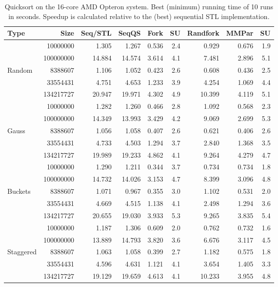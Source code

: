 \documentclass[preprint]{sigplanconf}
\begin{document}
\begin{table*}[t!]
\begin{center}
\begin{tabular}{|lr|rr|rrr||rr|}
\hline
Type & Size & Seq/STL & SeqQS & Fork & SU & Randfork & MMPar & SU \\
\hline
 & 10000000 & 1.305 & 1.267 & 0.536 & 2.4 & 0.929 & 0.676 & 1.9 \\
 & 100000000 & 14.884 & 14.574 & 3.614 & 4.1 & 7.481 & 2.896 & 5.1 \\
Random & 8388607 & 1.106 & 1.052 & 0.423 & 2.6 & 0.608 & 0.436 & 2.5 \\
 & 33554431 & 4.751 & 4.653 & 1.233 & 3.9 & 4.254 & 1.069 & 4.4 \\
 & 134217727 & 20.947 & 19.971 & 4.302 & 4.9 & 10.399 & 4.119 & 5.1 \\
\hline
 & 10000000 & 1.282 & 1.260 & 0.466 & 2.8 & 1.092 & 0.568 & 2.3 \\
 & 100000000 & 14.349 & 13.993 & 3.429 & 4.2 & 9.069 & 2.699 & 5.3 \\
Gauss & 8388607 & 1.056 & 1.058 & 0.407 & 2.6 & 0.621 & 0.406 & 2.6 \\
 & 33554431 & 4.733 & 4.503 & 1.294 & 3.7 & 2.840 & 1.368 & 3.5 \\
 & 134217727 & 19.989 & 19.233 & 4.862 & 4.1 & 9.264 & 4.279 & 4.7 \\
\hline
 & 10000000 & 1.290 & 1.211 & 0.344 & 3.7 & 0.734 & 0.734 & 1.8 \\
 & 100000000 & 14.732 & 14.026 & 3.153 & 4.7 & 8.399 & 3.096 & 4.8 \\
Buckets & 8388607 & 1.071 & 0.967 & 0.355 & 3.0 & 1.102 & 0.531 & 2.0 \\
 & 33554431 & 4.669 & 4.515 & 1.138 & 4.1 & 2.498 & 1.294 & 3.6 \\
 & 134217727 & 20.655 & 19.030 & 3.933 & 5.3 & 9.265 & 3.835 & 5.4 \\
\hline
 & 10000000 & 1.187 & 1.306 & 0.609 & 2.0 & 0.762 & 0.732 & 1.6 \\
 & 100000000 & 13.889 & 14.793 & 3.820 & 3.6 & 6.676 & 3.117 & 4.5 \\
Staggered & 8388607 & 1.063 & 1.058 & 0.399 & 2.7 & 1.182 & 0.575 & 1.8 \\
 & 33554431 & 4.596 & 4.631 & 1.121 & 4.1 & 3.654 & 1.405 & 3.3 \\
 & 134217727 & 19.129 & 19.659 & 4.613 & 4.1 & 10.233 & 3.955 & 4.8 \\
\hline
\end{tabular}
\end{center}
\caption{Quicksort on the 16-core AMD Opteron system. 
Best (minimum) running time of 10 runs in seconds.
Speedup is calculated relative to the (best) sequential STL implementation.}
\label{tab:sort_daisy_min}
\end{table*}
\end{document}
